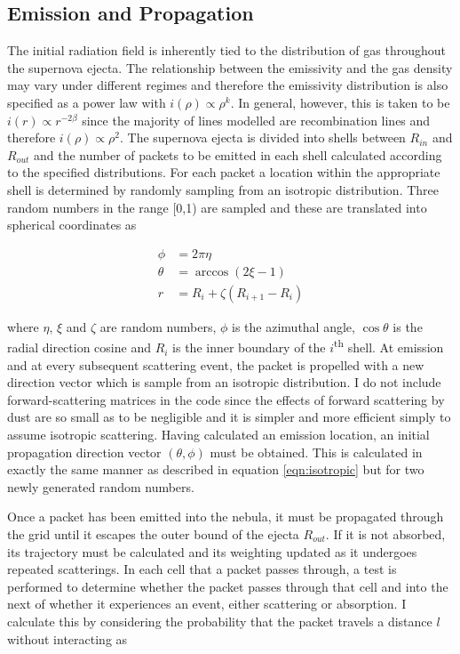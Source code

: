 	\subsection{Emission and Propagation}
	\label{sctn:em_prop}
	The initial radiation field is inherently tied to the distribution of gas throughout the supernova ejecta.  The relationship between the emissivity and the gas density may vary under different regimes and therefore the emissivity distribution is also specified as a power law with $i(\rho) \propto \rho^{k}$.  In general, however, this is taken to be $i(r) \propto r ^{-2\beta}$ since the majority of lines modelled are recombination lines and therefore $i(\rho) \propto \rho^2$.  The supernova ejecta is divided into shells between $R_{in}$ and $R_{out}$ and the number of packets to be emitted in each shell calculated according to the specified distributions.  For each packet a location within the appropriate shell is determined by randomly sampling from an isotropic distribution.  Three random numbers in the range [0,1) are sampled and these are translated into spherical coordinates as 

	\begin{align}
		\phi&=2\pi\eta \\
		\theta&=\arccos(2\xi -1) \\
		r&=R_i+\zeta(R_{i+1}-R_i)
		\label{eqn:isotropic}
	\end{align}

\noindent where $\eta$, $\xi$ and $\zeta$ are random numbers, $\phi$ is the azimuthal angle, $\cos \theta$ is the radial direction cosine and $R_i$ is the inner boundary of the $i$\textsuperscript{th} shell.  At emission and at every subsequent scattering event, the packet is propelled with a new direction vector which is sample from an isotropic distribution.  I do not include forward-scattering matrices in the code since the effects of forward scattering by dust are so small as to be negligible and it is simpler and more efficient simply to assume isotropic scattering.  Having calculated an emission location, an initial propagation direction vector $(\theta,\phi)$ must be obtained.  This is calculated in exactly the same manner as described in equation \ref{eqn:isotropic} but for two newly generated random numbers.

Once a packet has been emitted into the nebula, it must be propagated through the grid until it escapes the outer bound of the ejecta $R_{out}$.  If it is not absorbed, its trajectory must be calculated and its weighting updated as it undergoes repeated scatterings.  In each cell that a packet passes through, a test is performed to determine whether the packet passes through that cell and into the next of whether it experiences an event, either scattering or absorption.  I calculate this by considering the probability that the packet travels a distance $l$ without interacting as 

